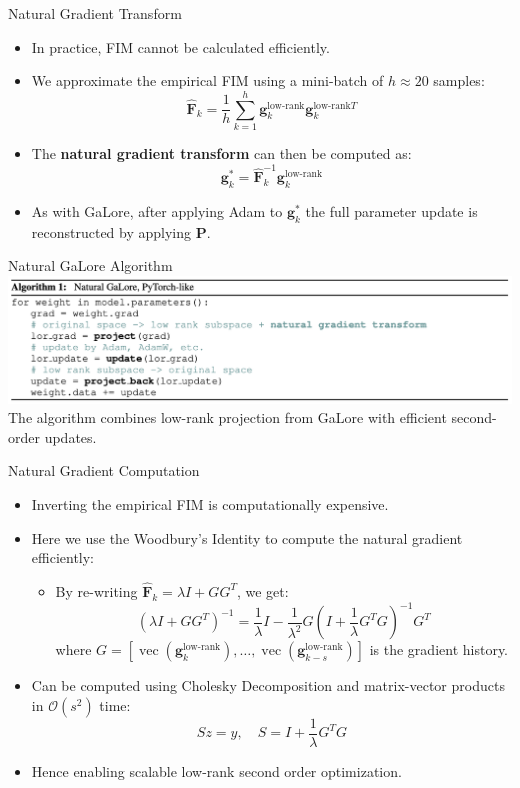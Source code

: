 \documentclass{beamer}
\begin{document}
\begin{frame}{Natural Gradient Transform}
    \begin{itemize}
        \item In practice, FIM cannot be calculated efficiently.
        \item We approximate the empirical FIM using a mini-batch of \(h \approx 20\) samples:
        \[
            \mathbf{\hat{F}}_k = \frac{1}{h} \sum_{k=1}^{h} \mathbf{g}_{k}^{\text{low-rank}} \mathbf{g}_{k}^{\text{low-rank} T}
        \]
        \item The \textbf{natural gradient transform} can then be computed as:
        \[
            \mathbf{g}_k^* = \mathbf{\hat{F}}_k^{-1} \mathbf{g}_{k}^{\text{low-rank}}
        \]
        \item As with GaLore, after applying Adam to \(\mathbf{g}_k^*\) the full parameter update is reconstructed by applying \(\mathbf{P}\).
    \end{itemize}
\end{frame}

\begin{frame}{Natural GaLore Algorithm}
    \includegraphics[width=\textwidth]{figures/natural_galore_algorithm.png}
    The algorithm combines low-rank projection from GaLore with efficient second-order updates.
\end{frame}

\begin{frame}{Natural Gradient Computation}
    \begin{itemize}
        \item Inverting the empirical FIM is computationally expensive.
        \item Here we use the Woodbury's Identity to compute the natural gradient efficiently:
            \begin{itemize}
                \item By re-writing \(\mathbf{\hat{F}}_k = \lambda I + GG^T\), we get:
                    \[
                    (\lambda I + GG^T)^{-1} = \frac{1}{\lambda} I - \frac{1}{\lambda^2} G (I + \frac{1}{\lambda} G^T G)^{-1} G^T
                    \]
                    where \(G = [\operatorname{vec}(\mathbf{g}_{k}^{\text{low-rank}}), \ldots, \operatorname{vec}(\mathbf{g}_{k-s}^{\text{low-rank}})]\) is the gradient history.
            \end{itemize}
        \item Can be computed using Cholesky Decomposition and matrix-vector products in \(\mathcal{O}(s^2)\) time:
                \[
                    S z = y, \quad S = I + \frac{1}{\lambda} G^T G
                \]
        \item Hence enabling scalable low-rank second order optimization.
    \end{itemize}
\end{frame}
\end{document}
